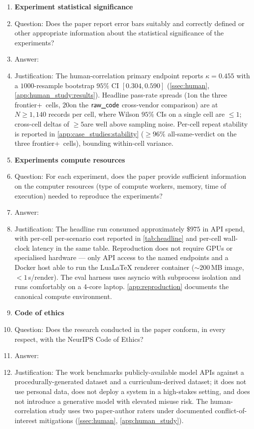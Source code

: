 \begin{enumerate}
\item {\bf Experiment statistical significance}
\item[] Question: Does the paper report error bars suitably and correctly defined or other appropriate information about the statistical significance of the experiments?
\item[] Answer: \answerYes{}
\item[] Justification: The human-correlation primary endpoint reports $\kappa = 0.455$ with a $1000$-resample bootstrap $95\%$ CI $[0.304, 0.590]$ (\cref{ssec:human}, \cref{app:human_study:results}). Headline pass-rate spreads ($1$\pp on the three frontier+\structured\ cells, $20$\pp on the $\textsf{raw\_code}$ cross-vendor comparison) are at $N \geq 1{,}140$ records per cell, where Wilson $95\%$ CIs on a single cell are $\leq 1$\pp; cross-cell deltas of $\geq 5$\pp are well above sampling noise. Per-cell repeat stability is reported in \cref{app:case_studies:stability} ($\geq 96\%$ all-same-verdict on the three frontier+\structured\ cells), bounding within-cell variance.

\item {\bf Experiments compute resources}
\item[] Question: For each experiment, does the paper provide sufficient information on the computer resources (type of compute workers, memory, time of execution) needed to reproduce the experiments?
\item[] Answer: \answerYes{}
\item[] Justification: The headline run consumed approximately $\$975$ in API spend, with per-cell per-scenario cost reported in \cref{tab:headline} and per-cell wall-clock latency in the same table. Reproduction does not require GPUs or specialised hardware --- only API access to the named endpoints and a Docker host able to run the LuaLaTeX renderer container ($\sim 200$\,MB image, $<1$\,s/render). The eval harness uses asyncio with subprocess isolation and runs comfortably on a 4-core laptop. \cref{app:reproduction} documents the canonical compute environment.

\item {\bf Code of ethics}
\item[] Question: Does the research conducted in the paper conform, in every respect, with the NeurIPS Code of Ethics?
\item[] Answer: \answerYes{}
\item[] Justification: The work benchmarks publicly-available model APIs against a procedurally-generated dataset and a curriculum-derived dataset; it does not use personal data, does not deploy a system in a high-stakes setting, and does not introduce a generative model with elevated misuse risk. The human-correlation study uses two paper-author raters under documented conflict-of-interest mitigations (\cref{ssec:human}, \cref{app:human_study}).


\end{enumerate}
